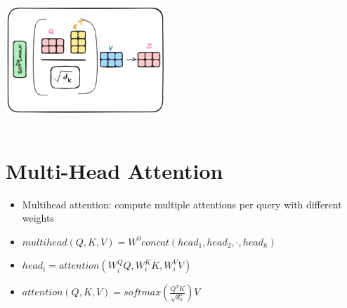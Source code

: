 \documentclass{article}
\begin{document}
\begin{minipage}{0.5\textwidth}
\includegraphics[width=6cm, height=5cm]{Transformer/Images/SelfAttention5.png}
\end{minipage}

\section{Multi-Head Attention}
\begin{itemize}
    \item Multihead attention: compute multiple attentions per query with different weights
    \item $multihead(Q,K,V) = W^0 concat(head_1, head_2, \cdot , head_h)$ 
    \item $ head_i = attention(W_i^QQ, W_i^K K, W_i^V V )$
    \item $attention(Q,K,V) = softmax(\frac{Q^T K}{\sqrt{d_k}} )V$ 
\end{itemize}
\end{document}
